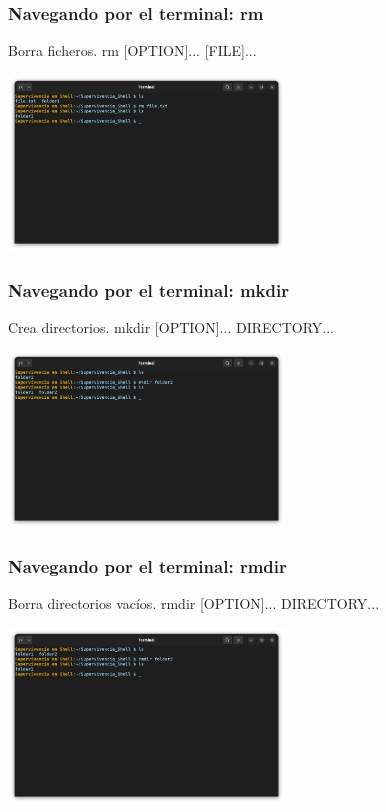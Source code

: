 \documentclass[10pt]{beamer}
\begin{document}
	\begin{frame}
		\frametitle{Navegando por el terminal: rm}
		\begin{alertblock}{Borra ficheros.}
			rm [OPTION]... [FILE]...
		\end{alertblock}
		\begin{center}
			\includegraphics[width=0.55\textwidth]{rm}
		\end{center}
	\end{frame}	
		
	\begin{frame}
		\frametitle{Navegando por el terminal: mkdir}
		\begin{alertblock}{Crea directorios.}
			mkdir [OPTION]... DIRECTORY...
		\end{alertblock}
		\begin{center}
			\includegraphics[width=0.55\textwidth]{mkdir}
		\end{center}
	\end{frame}	

	\begin{frame}
		\frametitle{Navegando por el terminal: rmdir}
		\begin{alertblock}{Borra directorios vacíos.}
			rmdir [OPTION]... DIRECTORY...
		\end{alertblock}
		\begin{center}
			\includegraphics[width=0.55\textwidth]{rmdir}
		\end{center}
	\end{frame}
	
\end{document}
